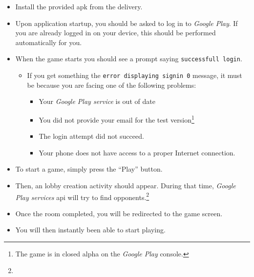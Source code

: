 \begin{itemize}
	\item Install the provided \gls{apk} from the delivery.
	\item Upon application startup, you should be asked to log in to \textit{Google Play}. If you are already logged in on your device, this should be performed automatically for you.
	\item When the game starts you should see a prompt saying \texttt{successfull login}.
	\begin{itemize}
		\item If you get something the \texttt{error displaying signin 0} message, it must be because you are facing one of the following problems:
    \begin{itemize}
      \item Your \textit{Google Play service} is out of date
      \item You did not provide your email for the test version\footnote{The game is in closed alpha on the \textit{Google Play} console.}
      \item The login attempt did not succeed. \item Your phone does not have access to a proper Internet connection.
    \end{itemize}
	\end{itemize}
\end{itemize}

\begin{itemize}
	\item To start a game, simply press the “Play” button.
  \item Then, an lobby creation activity should appear. During that time, \textit{Google Play services} \gls{api} will try to find opponents.\footnote{}
  \item Once the room completed, you will be redirected to the game screen.
	\item You will then instantly been able to start playing.
\end{itemize}


